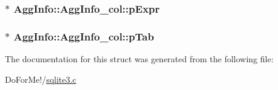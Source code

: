\hypertarget{struct_agg_info_1_1_agg_info__col_a60f23ec0abfcc88cab7083967a3abd9e}{
\subsubsection[{p\-Expr}]{$\ast$ Agg\-Info\-::\-Agg\-Info\-\_\-col\-::p\-Expr}}\label{struct_agg_info_1_1_agg_info__col_a60f23ec0abfcc88cab7083967a3abd9e}
\hypertarget{struct_agg_info_1_1_agg_info__col_ad2f2ae137b49e72d28a57accc9d06386}{
\subsubsection[{p\-Tab}]{$\ast$ Agg\-Info\-::\-Agg\-Info\-\_\-col\-::p\-Tab}}\label{struct_agg_info_1_1_agg_info__col_ad2f2ae137b49e72d28a57accc9d06386}


The documentation for this struct was generated from the following file\-:\begin{DoxyCompactItemize}
\item 
Do\-For\-Me!/\hyperlink{sqlite3_8c}{sqlite3.\-c}\end{DoxyCompactItemize}

